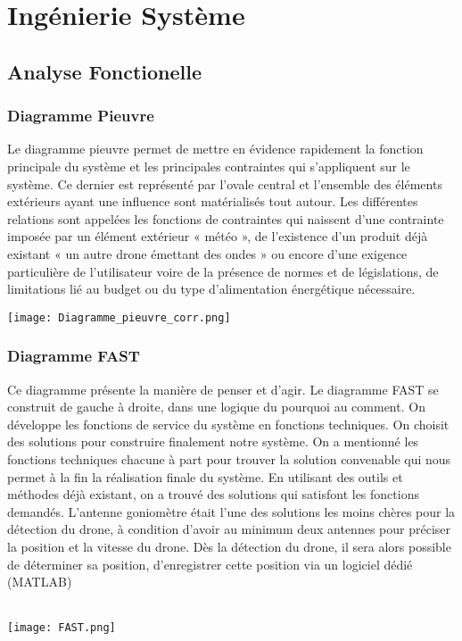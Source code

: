 \chapter{Ingénierie Système}

\section{Analyse Fonctionelle}

\subsection{Diagramme Pieuvre}

Le diagramme pieuvre permet de mettre en évidence rapidement la fonction principale du système et les principales contraintes qui s'appliquent sur le système. Ce dernier est représenté par l'ovale central et l'ensemble des éléments extérieurs ayant une influence sont matérialisés tout autour. Les différentes relations sont appelées les fonctions de contraintes qui naissent d'une contrainte imposée par un élément extérieur « météo », de l'existence d'un produit déjà existant « un autre drone émettant des ondes » ou encore d'une exigence particulière de l'utilisateur voire de la présence de normes et de législations, de limitations lié au budget ou du type d'alimentation énergétique nécessaire.


\texttt{[image: Diagramme\_pieuvre\_corr.png]}


\subsection{Diagramme FAST}

Ce diagramme  présente la  manière de penser et d'agir. Le diagramme FAST se construit de gauche à droite, dans une logique du pourquoi au comment. On développe les fonctions de service du système en fonctions techniques. On choisit des solutions pour construire finalement notre système. On a mentionné les fonctions techniques chacune  à part pour trouver la solution convenable qui nous permet à la fin la réalisation finale du système. En utilisant des outils et méthodes déjà existant, on a trouvé des solutions qui satisfont les fonctions demandés.
L’antenne goniomètre était l’une des solutions les moins chères pour la détection du drone, à condition d’avoir au minimum deux antennes pour préciser la position et la vitesse du drone. Dès la détection du drone, il sera alors possible de déterminer sa position, d'enregistrer cette position via un logiciel dédié (MATLAB)

~\\

\texttt{[image: FAST.png]}

